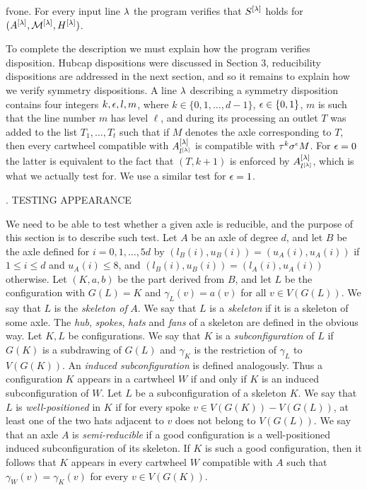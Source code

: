 \thm fvone.  For every input line $\lambda$ the program verifies that $S^{[\lambda]}$
holds for $(A^{[\lambda]}, {\cal M}^{[\lambda]}, H^{[\lambda]})$.  

To complete the description we must explain how the program verifies disposition.
Hubcap dispositions were discussed in Section 3, reducibility dispositions 
are addressed
in the next section, and so it remains to explain how we verify symmetry 
dispositions.
A line $\lambda$ describing a symmetry disposition contains four integers 
$k,\epsilon,l,m $, where $k\in \{0,1,\dots, d-1\}$, $\epsilon\in \{0,1\}$, $m$ 
is such 
that the line number $m$ has level $\ell$, and during its processing an 
outlet $T$ was added
to the list $T_1,\dots, T_t$ such that if $M$ denotes the axle corresponding 
to $T$, then
every cartwheel compatible with $A^{[\lambda]}_{l^{[\lambda]}}$ is compatible 
with
$\tau^k\sigma^\epsilon M$.  For $\epsilon=0$ the latter is equivalent to the fact
that $(T,k+1)$ is enforced by $A^{[\lambda]}_{l^{[\lambda]}}$, which is what 
we actually test for. We use a similar test for $\epsilon=1$.



. TESTING APPEARANCE

We need to be able to test whether a given axle is reducible, and the 
purpose of this section
is to describe such test.  Let $A$ be an axle of degree $d$, and let
$B$ be the axle defined for $i=0,1,\ldots,5d$ by $(l_B(i),u_B(i))=
(u_A(i),u_A(i))$ if $1\le i\le d$ and $u_A(i)\le8$, and
$(l_B(i),u_B(i))=(l_A(i),u_A(i))$ otherwise.
Let $(K,a,b)$ be the part 
derived from $B$,
and let $L$ be the configuration with $G(L)=K$ and $\gamma_L(v)=a(v)$ 
for all
$v\in V(G(L))$.  We say that $L$ is the {\it skeleton of} $A$.  We say 
that $L$ is a {\it skeleton}
if it is a skeleton of some axle.  The {\it hub}, {\it spokes}, 
{\it hats} and {\it fans} of a  skeleton are defined in the 
obvious way.  Let $K,L$  be configurations.  We say that $K$ is a {\it 
subconfiguration}
of $L$ if $G(K)$ is a subdrawing of $G(L)$ and $\gamma_K$ is the restriction 
of
$\gamma_L$ to $V(G(K))$.  An {\it induced subconfiguration} is defined
analogously.  Thus a configuration $K$ appears in a cartwheel $W$ if
and only if $K$  is an induced
subconfiguration of $W$.  Let $L$ be a subconfiguration of a skeleton 
$K$.  We say that
$L$ is {\it well-positioned} in $K$ if for every spoke $v\in
V(G(K))-V(G(L))$, at least one of the two hats adjacent to $v$ does
not belong to $V(G(L))$.   We say that
an axle $A$ is {\it semi-reducible} if a good configuration is a well-positioned
induced subconfiguration of its skeleton.  If $K$ is such a good configuration, 
then it
follows that $K$ appears in every cartwheel $W$ compatible with $A$ such 
that
$\gamma_W(v)=\gamma_K(v)$ for every $v\in V(G(K))$.  

